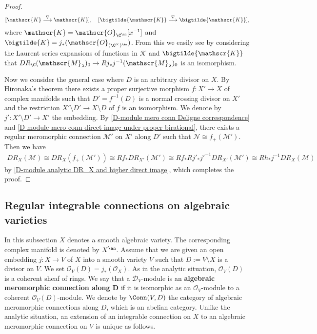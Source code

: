 \begin{proof}
\[[\mathscr{K}\stackrel{\nabla}{\longrightarrow}\mathscr{K}],\quad [\bigtilde{\mathscr{K}}\stackrel{\nabla}{\longrightarrow}\bigtilde{\mathscr{K}}],\]
where $\mathscr{K}=\mathscr{O}_{\C^{\an}}[x^{-1}]$ and $\bigtilde{K}=j_*(\mathscr{O}_{(\C^\times)^\an})$. From this we easily see by considering the Laurent series expansions of functions in $\mathscr{K}$ and $\bigtilde{\mathscr{K}}$ that $DR_{\C}(\mathscr{M}_\lambda)_0\to Rj_*j^{-1}(\mathscr{M}_\lambda)_0$ is an isomorphism.\par
Now we consider the general case where $D$ is an arbitrary divisor on $X$. By Hironaka's theorem there exists a proper surjective morphism $f:X'\to X$ of complex manifolds such that $D'=f^{-1}(D)$ is a normal crossing divisor on $X'$ and the restriction $X'\setminus D'\to X\setminus D$ of $f$ is an isomorphism. We denote by $j':X'\setminus D'\to X'$ the embedding. By \cref{D-module mero conn Deligne correspondence} and \cref{D-module mero conn direct image under proper birational}, there exists a regular meromorphic connection $\mathscr{M}'$ on $X'$ along $D'$ such that $\mathscr{N}\cong f_+(\mathscr{M}')$. Then we have
\begin{align*}
DR_X(\mathscr{M})\cong DR_X(f_+(\mathscr{M}'))\cong Rf_*DR_{X'}(\mathscr{M}')\cong Rf_*Rj'_*j'^{-1}DR_{X'}(\mathscr{M}')\cong Rh_*j^{-1}DR_X(\mathscr{M})
\end{align*}
by \cref{D-module analytic DR_X and higher direct image}, which completes the proof.
\end{proof}

\subsection{Regular integrable connections on algebraic varieties}\label{D-module integrable connection regular subsection}
In this subsection $X$ denotes a smooth algebraic variety. The corresponding complex manifold is denoted by $X^{\an}$. Assume that we are given an open embedding $j:X\to V$ of $X$ into a smooth variety $V$ such that $D:=V\setminus X$ is a divisor on $V$. We set $\mathscr{O}_V(D)=j_*(\mathscr{O}_X)$. As in the analytic situation, $\mathscr{O}_V(D)$ is a coherent sheaf of rings. We say that a $\mathscr{D}_V$-module is an \textbf{algebraic meromorphic connection along $\bm{D}$} if it is isomorphic as an $\mathscr{O}_V$-module to a coherent $\mathscr{O}_V(D)$-module. We denote by $\Conn(V,D)$ the category of algebraic meromorphic connections along $D$, which is an abelian category. Unlike the analytic situation, an extension of an integrable connection on $X$ to an algebraic meromorphic connection on $V$ is unique as follows.

